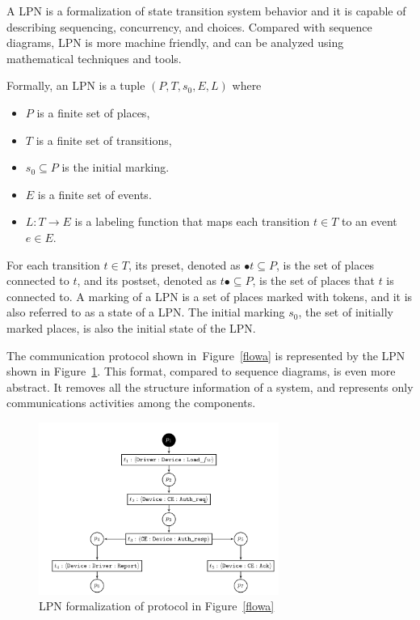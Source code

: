 \documentclass[12pt,frontmatter,copyright,thesis]{usfmanus}
\begin{document}
A LPN is a formalization of state transition 
system behavior and it is capable of describing sequencing, concurrency, and choices.  
Compared with sequence diagrams,
LPN is more machine friendly, and can be
analyzed using mathematical techniques and tools.

 
 Formally, an LPN is a tuple $(P, T, s_0, E, L)$  where
 \begin{itemize}
 \item $P$ is a finite set of places,
 \item $T$ is a finite set of transitions,
 \item $s_0 \subseteq P$ is the initial marking.
 \item $E$ is a finite set of events.
 \item $L: T \rightarrow E$ is a labeling function that maps each transition $t \in T$ to an event $e \in E$. 
 \end{itemize}
 
 For each transition $t \in T$, its preset, denoted as $\bullet{t} \subseteq P$, is the set of places connected to $t$, and its postset, denoted as $t\bullet \subseteq P$, is the set of places that $t$ is connected to.  A marking of a LPN is a set of places marked with tokens, and it is also referred to as a state of a LPN. The initial marking $s_0$,
 the set of initially marked places, is 
 also the initial state of the LPN.


 The communication protocol shown
 in~Figure~\ref{flowa} is represented by the LPN
 shown in Figure~\ref{changedb}. 
 This format,
 compared to sequence diagrams,
 is even more abstract. It removes
 all the structure information of a
 system, and represents only communications
activities among the components.
 
 \begin{figure}[h]
\centering
    \includegraphics[width=0.7\textwidth]{try}
  \caption{LPN formalization of protocol in Figure~\ref{flowa}}
  \label{changedb}
\end{figure}
\end{document}
